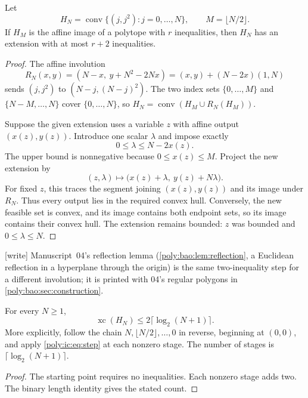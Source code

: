 \documentclass[11pt,a4paper]{article}
\numberwithin{equation}{section}
\theoremstyle{plain}
\newcommand{\wtag}{\textup{[write]}}%
\newcommand{\conv}{\operatorname{conv}}
\newcommand{\xc}{\operatorname{xc}}
\begin{document}
\begin{lemma}\label{poly:ic:lem:reflection}
Let
\[
 H_N=\conv\{(j,j^2):j=0,\ldots,N\},\qquad M=\lfloor N/2\rfloor.
\]
If $H_M$ is the affine image of a polytope with $r$ inequalities, then
$H_N$ has an extension with at most $r+2$ inequalities.
\end{lemma}
\begin{proof}
The affine involution
\begin{equation}\label{poly:ic:eq:reflection}
 R_N(x,y)=(N-x,\ y+N^2-2Nx)
          =(x,y)+(N-2x)(1,N)
\end{equation}
sends $(j,j^2)$ to $(N-j,(N-j)^2)$. The two index sets
$\{0,\ldots,M\}$ and $\{N-M,\ldots,N\}$ cover $\{0,\ldots,N\}$,
so $H_N=\conv(H_M\cup R_N(H_M))$.

Suppose the given extension uses a variable $z$ with affine output
$(x(z),y(z))$. Introduce one scalar $\lambda$ and impose exactly
\begin{equation}\label{poly:ic:eq:step}
 0\leq\lambda\leq N-2x(z).
\end{equation}
The upper bound is nonnegative because $0\leq x(z)\leq M$.
Project the new extension by
\[
 (z,\lambda)\longmapsto
       \bigl(x(z)+\lambda,\ y(z)+N\lambda\bigr).
\]
For fixed $z$, this traces the segment joining $(x(z),y(z))$ and its
image under $R_N$. Thus every output lies in the required convex hull.
Conversely, the new feasible set is convex, and its image contains
both endpoint sets, so its image contains their convex hull. The
extension remains bounded: $z$ was bounded and $0\leq\lambda\leq N$.
\end{proof}

\wtag{} Manuscript~04's reflection lemma (\cref{poly:bao:lem:reflection}, a
Euclidean reflection in a hyperplane through the origin) is the same
two-inequality step for a different involution; it is printed with 04's
regular polygons in \cref{poly:bao:sec:construction}.

\begin{corollary}\label{poly:ic:cor:parabola}
For every $N\geq1$,
\[
 \xc(H_N)\leq 2\lceil\log_2(N+1)\rceil.
\]
More explicitly, follow the chain $N,\lfloor N/2\rfloor,\ldots,0$
in reverse, beginning at $(0,0)$, and apply \eqref{poly:ic:eq:step} at each
nonzero stage. The number of stages is
$\lceil\log_2(N+1)\rceil$.
\end{corollary}
\begin{proof}
The starting point requires no inequalities. Each nonzero stage adds two.
The binary length identity gives the stated count.
\end{proof}
\end{document}
